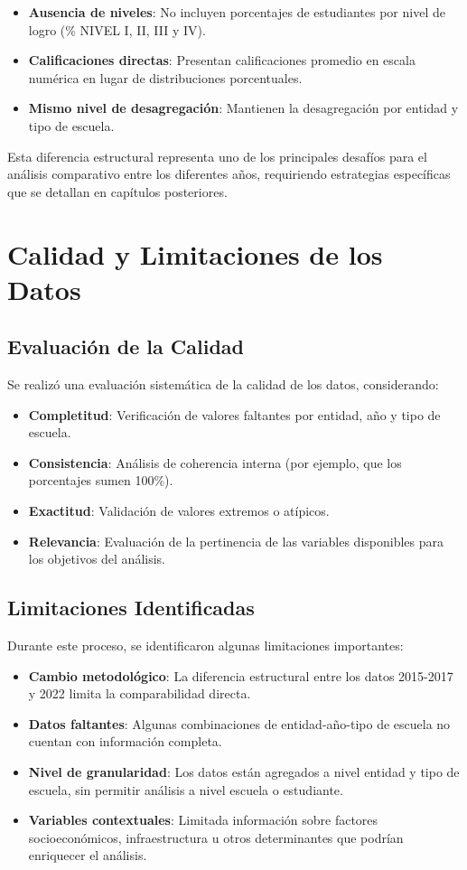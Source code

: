 \begin{itemize}
    \item \textbf{Ausencia de niveles}: No incluyen porcentajes de estudiantes por nivel de logro (\% NIVEL I, II, III y IV).
    \item \textbf{Calificaciones directas}: Presentan calificaciones promedio en escala numérica en lugar de distribuciones porcentuales.
    \item \textbf{Mismo nivel de desagregación}: Mantienen la desagregación por entidad y tipo de escuela.
\end{itemize}

Esta diferencia estructural representa uno de los principales desafíos para el análisis comparativo entre los diferentes años, requiriendo estrategias específicas que se detallan en capítulos posteriores.

\section{Calidad y Limitaciones de los Datos}

\subsection{Evaluación de la Calidad}
Se realizó una evaluación sistemática de la calidad de los datos, considerando:

\begin{itemize}
    \item \textbf{Completitud}: Verificación de valores faltantes por entidad, año y tipo de escuela.
    \item \textbf{Consistencia}: Análisis de coherencia interna (por ejemplo, que los porcentajes sumen 100\%).
    \item \textbf{Exactitud}: Validación de valores extremos o atípicos.
    \item \textbf{Relevancia}: Evaluación de la pertinencia de las variables disponibles para los objetivos del análisis.
\end{itemize}

\subsection{Limitaciones Identificadas}
Durante este proceso, se identificaron algunas limitaciones importantes:

\begin{itemize}
    \item \textbf{Cambio metodológico}: La diferencia estructural entre los datos 2015-2017 y 2022 limita la comparabilidad directa.
    \item \textbf{Datos faltantes}: Algunas combinaciones de entidad-año-tipo de escuela no cuentan con información completa.
    \item \textbf{Nivel de granularidad}: Los datos están agregados a nivel entidad y tipo de escuela, sin permitir análisis a nivel escuela o estudiante.
    \item \textbf{Variables contextuales}: Limitada información sobre factores socioeconómicos, infraestructura u otros determinantes que podrían enriquecer el análisis.
\end{itemize}

